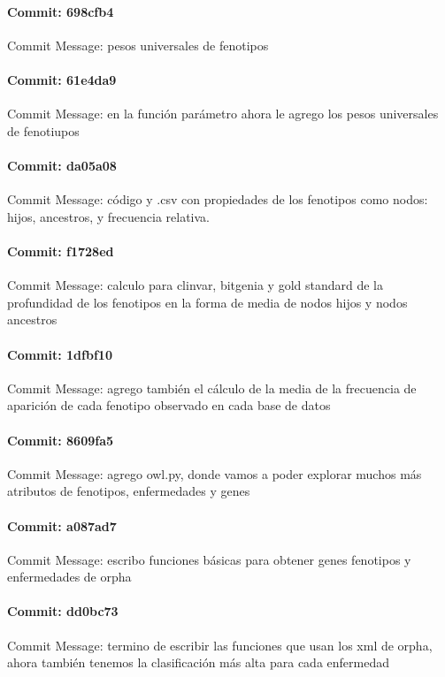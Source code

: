 \documentclass{article}
\begin{document}
\paragraph{Commit: 698cfb4}
Commit Message: pesos universales de fenotipos

\paragraph{Commit: 61e4da9}
Commit Message: en la función parámetro ahora le agrego los pesos universales de fenotiupos

\paragraph{Commit: da05a08}
Commit Message: código y .csv con propiedades de los fenotipos como nodos: hijos, ancestros, y frecuencia relativa.

\paragraph{Commit: f1728ed}
Commit Message: calculo para clinvar, bitgenia y gold standard de la profundidad de los fenotipos en la forma de media de nodos hijos y nodos ancestros

\paragraph{Commit: 1dfbf10}
Commit Message: agrego también el cálculo de la media de la frecuencia de aparición de cada fenotipo observado en cada base de datos

\paragraph{Commit: 8609fa5}
Commit Message: agrego owl.py, donde vamos a poder explorar muchos más atributos de fenotipos, enfermedades y genes

\paragraph{Commit: a087ad7}
Commit Message: escribo funciones básicas para obtener genes fenotipos y enfermedades de orpha

\paragraph{Commit: dd0bc73}
Commit Message: termino de escribir las funciones que usan los xml de orpha, ahora también tenemos la clasificación más alta para cada enfermedad
\end{document}
